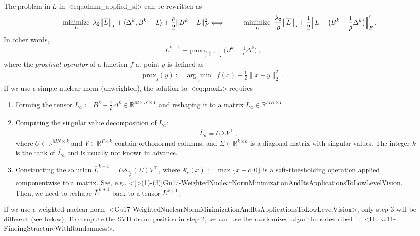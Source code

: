 \documentclass[a4paper,11pt]{article}
\def\\{}%
\def\cite#1{<#1>}%
\def\eqref#1{<#1>}%
\newcommand{\mypar}[1]{\bigskip\noindent {\bf #1.}}
\begin{document}
\mypar{Updating $\bm{L}$}
The problem in $L$ in~\eqref{eq:admm_applied_sl} can be rewritten as
\begin{align}
	 & \qquad
	\underset{L}{\text{minimize}} \,\,\,
	\lambda_2 \big\|\overline{L}\big\|_{\star}
	+
	\langle\Delta^k,B^k - L\rangle
	+
	\frac{\rho}{2}
	\|B^k - L\|_{F}^2
	\notag
	\\
	\Longleftrightarrow
	 & \qquad
	\underset{L}{\text{minimize}} \,\,\,
	\frac{\lambda_2}{\rho} \big\|\overline{L}\big\|_{\star}
	+
	\frac{1}{2}
	\Big\|L - \big(B^k + \frac{1}{\rho} \Delta^k\big)\Big\|_F^2\,.
	\label{eq:probL1}
\end{align}
In other words,
\begin{align}
	\label{eq:proxL}
	L^{k+1} =
	\text{prox}_{\frac{\lambda_2}{\rho}\|\overline{\cdot}\|_{\star}}\Big(B^k +
	\frac{1}{\rho}\Delta^k\Big)\,,
\end{align}
where the \textit{proximal operator} of a function $f$ at point $y$ is
defined as
\begin{align*}
	\text{prox}_f(y)
	:=
	\underset{x}{\arg\min}\,\,\, f(x) + \frac{1}{2}\|x - y\|_2^2\,.
\end{align*}
If we use a simple nuclear norm (unweighted), the solution to~\eqref{eq:proxL}
requires
\begin{enumerate}
	\item Forming the tensor $L_a := B^k + \frac{1}{\rho}\Delta^k \in
		      \mathbb{R}^{M\times N\times F}$ and reshaping it to a matrix
	      $\overline{L}_a \in \mathbb{R}^{MN \times F}$.

	\item Computing the singular value decomposition of $\overline{L}_a$:
	      \begin{align*}
		      \overline{L}_a = U \Sigma V^\top\,,
	      \end{align*}
	      where $U \in \mathbb{R}^{MN \times k}$ and $V \in \mathbb{R}^{F \times k}$
	      contain orthonormal columns, and $\Sigma \in \mathbb{R}^{k \times k}$ is a
	      diagonal matrix with singular values. The integer $k$ is the rank of
	      $\overline{L}_a$ and is usually not known in advance.

	\item Constructing the solution $\overline{L}^{k+1} = U
		      \mathcal{S}_{\frac{\lambda_2}{\rho}}(\Sigma)V^\top$\,, where
	      $\mathcal{S}_{c}(x) := \max\{x - c, 0\}$ is a soft-thresholding operation
	      applied componentwise to a matrix. See, e.g.,
	      \cite[(1)-(3)]{Gu17-WeightedNuclearNormMinimizationAndItsApplicationsToLowLevelVision}.
	      Then, we need to reshape $\overline{L}^{k+1}$ back to a tensor $L^{k+1}$.
\end{enumerate}
If we use a weighted nuclear
norm~\cite{Gu17-WeightedNuclearNormMinimizationAndItsApplicationsToLowLevelVision},
only step 3 will be different (see below). To compute the SVD decomposition in
step 2, we can use the randomized algorithms described
in~\cite{Halko11-FindingStructureWithRandomness}.
\end{document}
